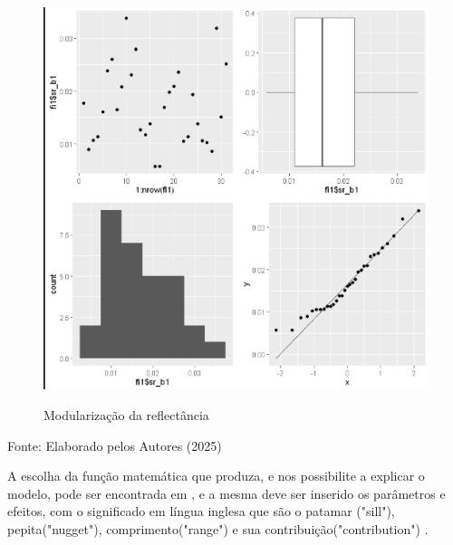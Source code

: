  \begin{minipage}[t!]{0.5\textwidth}
 	\begin{figure}[H]
 		\centering \small \caption{Modularização da reflectância}
 		\includegraphics[width=0.97\linewidth]{FIGURAS/normali}
 		\label{fig:Rplothdg}
 	\end{figure}		
 \end{minipage} 
 			\begin{center}
 				Fonte:   Elaborado pelos Autores (2025)
 			\end{center}
  \hspace*{1.25 cm} A escolha da função matemática que produza, e nos possibilite a explicar o modelo, pode ser encontrada em  \cite[p.90]{delgado}, e a mesma deve ser inserido os parâmetros e efeitos, com o significado em língua inglesa que são o patamar ("sill"), pepita("nugget"), comprimento("range") e sua contribuição("contribution") .	\\	
